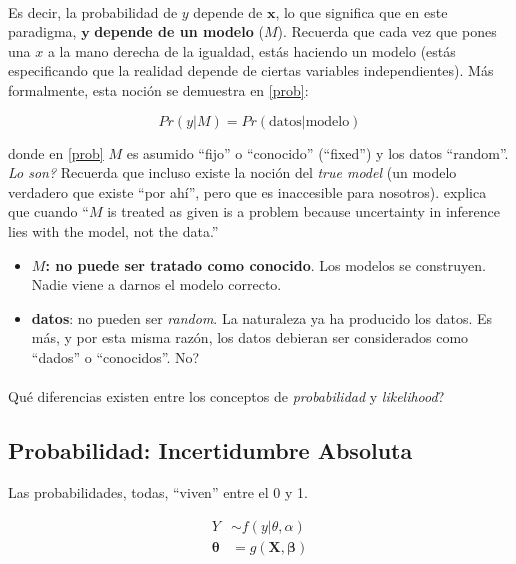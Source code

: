 \documentclass[10pt]{article}
\begin{document}
\paragraph{} Es decir, la probabilidad de $y$ depende de $\bm{x}$, lo que significa que en este paradigma, ${\mathbf y}$ {\bf depende de un modelo} ($M$). Recuerda que cada vez que pones una $x$ a la mano derecha de la igualdad, est\'as haciendo un modelo (est\'as especificando que la realidad depende de ciertas variables independientes). M\'as formalmente, esta noci\'on se demuestra en \autoref{prob}:

\begin{equation} \label{prob}
Pr(y|M) = Pr(\text{datos}|\text{modelo})
\end{equation}

donde en \autoref{prob} $M$  es asumido ``fijo'' o ``conocido'' (``fixed'') y los datos ``random''. \emph{Lo son?} Recuerda que incluso existe la noci\'on del \emph{true model} (un modelo verdadero que existe ``por ah\'i'', pero que es inaccesible para nosotros).  \textcite[16]{King1998} explica que cuando ``$M$ is treated as given is a problem because uncertainty in inference lies with the model, not the data.'' 

\begin{itemize}
  \item {\bf $M$: no puede ser tratado como conocido}. Los modelos se construyen. Nadie viene a darnos el modelo correcto.
  \item {\bf datos}: no pueden ser \emph{random}. La naturaleza ya ha producido los datos. Es m\'as, y por esta misma raz\'on, los datos debieran ser considerados como ``dados'' o ``conocidos''. No? 
\end{itemize}

\paragraph{} Qu\'e diferencias existen entre los conceptos de \emph{probabilidad} y \emph{likelihood}?

\subsection*{Probabilidad: Incertidumbre Absoluta}

Las probabilidades, todas, ``viven'' entre el 0 y 1. 

\begin{equation} \label{prob:model}
\begin{split}
Y & \sim f(y|\theta, \alpha) \\
\bm{\theta} & = g(\bm{X}, \bm{\beta})
\end{split}
\end{equation}
\end{document}
